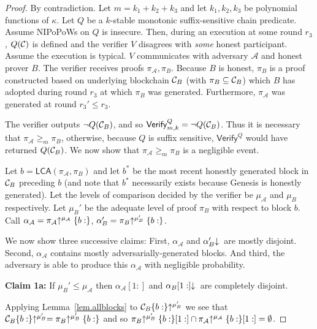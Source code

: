 \begin{proof}
    By contradiction. Let $m = k_1 + k_2 + k_3$ and let $k_1, k_2, k_3$ be
    polynomial functions of $\kappa$. Let $Q$ be a $k$-stable monotonic
    suffix-sensitive chain predicate. Assume NIPoPoWs on $Q$ is insecure. Then,
    during an execution at some round $r_3$, $Q(\mathcal{C})$ is defined and the
    verifier $V$ disagrees with \emph{some} honest participant. Assume the
    execution is typical. $V$ communicates with adversary $\mathcal{A}$ and
    honest prover $B$.  The verifier receives proofs $\pi_\mathcal{A}, \pi_B$.
    Because $B$ is honest, $\pi_B$ is a proof constructed based on underlying
    blockchain $\mathcal{C}_B$ (with $\pi_B \subseteq \mathcal{C}_B$) which $B$ has
    adopted during round $r_3$ at which $\pi_B$ was generated. Furthermore,
    $\pi_\mathcal{A}$ was generated at round $r_3' \leq r_3$.

    The verifier outputs $\lnot Q(\mathcal{C}_B)$, and so
    $\textsf{Verify}^Q_{m,k} = \lnot Q(\mathcal{C}_B)$. Thus it is necessary that
    $\pi_\mathcal{A} \geq_m \pi_B$, otherwise, because $Q$
    is suffix sensitive, $\textsf{Verify}^Q$ would have returned $Q(\mathcal{C}_B)$.
    We now show that $\pi_\mathcal{A} \geq_m \pi_B$ is a negligible event.

    Let $b = \textsf{LCA}(\pi_\mathcal{A}, \pi_B)$ and let $b^*$ be
    the most recent honestly generated block in $\mathcal{C}_B$ preceding $b$ (and
    note that $b^*$ necessarily exists because Genesis is honestly generated).
    Let the levels of comparison decided by the verifier be $\mu_\mathcal{A}$
    and $\mu_B$ respectively.
    Let $\mu_B'$ be the adequate level of proof $\pi_B$ with respect to block
    $b$. Call $\alpha_\mathcal{A} =
    \pi_\mathcal{A}\negthickspace\uparrow^{\mu_\mathcal{A}}\{b:\}$,
    $\alpha'_B = \pi_B\negthickspace\uparrow^{\mu_B'}\{b:\}$.

    We now show three successive claims: First, $\alpha_\mathcal{A}$ and
    $\alpha'_B\negthickspace\downarrow\,$ are mostly disjoint. Second, $\alpha_\mathcal{A}$
    contains mostly adversarially-generated blocks. And third, the adversary is
    able to produce this $\alpha_\mathcal{A}$ with negligible probability.

    \textbf{Claim 1a: } If $\mu_B' \leq \mu_\mathcal{A}$ then
    $\alpha_\mathcal{A}[1:]$ and $\alpha_B[1:]\negthickspace\downarrow\,$ are completely
    disjoint.

    Applying Lemma~\ref{lem.allblocks}
    to $\mathcal{C}_B\{b:\}\negthickspace\uparrow^{\mu_B'}$ we see that
    $\mathcal{C}_B\{b:\}\negthickspace\uparrow^{\mu_B'} = \pi_B\negthickspace\uparrow^{\mu_B'}\{b:\}$ and so
    $\pi_B\negthickspace\uparrow^{\mu_B'}\{b:\}[1:] \cap
    \pi_\mathcal{A}\negthickspace\uparrow^{\mu_\mathcal{A}}\{b:\}[1:] = \emptyset$.


\end{proof}
